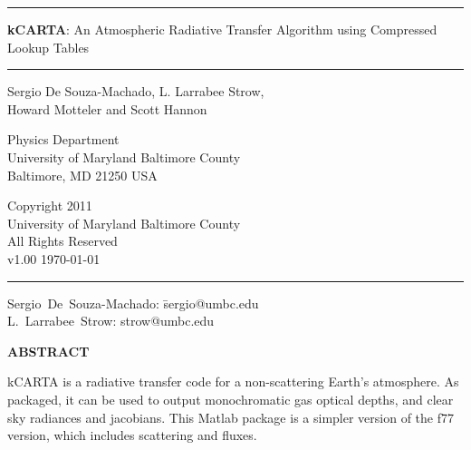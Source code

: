 \documentclass[12pt]{article}
\newcommand{\kc}{\textsf{kCARTA}\xspace}
\newcommand{\HRule}{\rule{\linewidth}{1mm}}
\newcommand{\HRulethin}{\rule{\linewidth}{0.5mm}}
\begin{document}
\thispagestyle{empty}
\vspace{2.0in}

\noindent\HRule
\begin{center}
\Huge \textbf{\textsf{kCARTA}}: An Atmospheric Radiative Transfer Algorithm 
using Compressed Lookup Tables
\end{center}
\noindent\HRule

\vspace{0.75in}
\begin{center}
\begin{Large}
Sergio De Souza-Machado, L. Larrabee Strow,\\ Howard Motteler and Scott
Hannon
\end{Large}
\end{center}

\vspace{0.5in}
\begin{center}
Physics Department\\
University of Maryland Baltimore County\\Baltimore, MD 21250 USA\\
\end{center}

\vspace{0.5in}
\begin{center}
Copyright 2011 \\
University of Maryland Baltimore County \\
All Rights Reserved\\
v1.00  \today\\
\end{center}

\vfill

\noindent\HRulethin
\begin{flushleft}
\begin{tabbing}
Sergio~De~Souza-Machado: \=    sergio@umbc.edu \\
L.~Larrabee~Strow:   \>        strow@umbc.edu\\
\end{tabbing}
\end{flushleft}


\newpage
\tableofcontents
\newpage

\begin{center}
{\bf ABSTRACT}
\end{center}
\kc is a radiative transfer code for a non-scattering Earth's
atmosphere.  As packaged, it can be used to output monochromatic gas optical
depths, and clear sky radiances and jacobians. This Matlab package is a 
simpler version of the f77 version, which includes scattering and fluxes.
\end{document}
